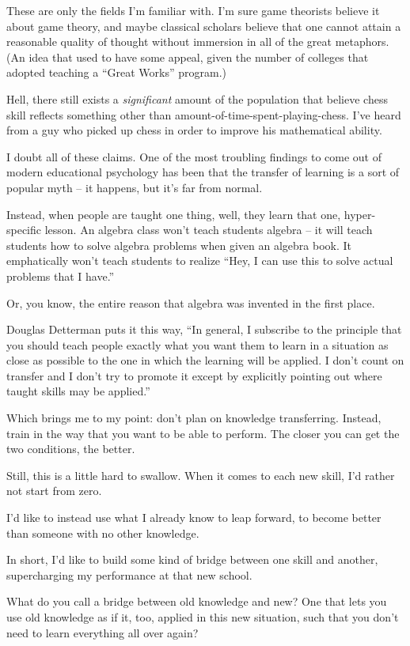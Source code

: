 These are only the fields I'm familiar with. I'm sure game theorists believe it
about game theory, and maybe classical scholars believe that one cannot attain a
reasonable quality of thought without immersion in all of the great
metaphors. (An idea that used to have some appeal, given the number of colleges
that adopted teaching a ``Great Works'' program.)

Hell, there still exists a \textit{significant} amount of the population that
believe chess skill reflects something other than
amount-of-time-spent-playing-chess. I've heard from a guy who picked up chess in
order to improve his mathematical ability.

I doubt all of these claims. One of the most troubling findings to come out of
modern educational psychology has been that the transfer of learning is a sort
of popular myth -- it happens, but it's far from normal.

Instead, when people are taught one thing, well, they learn that one,
hyper-specific lesson. An algebra class won't teach students algebra -- it will
teach students how to solve algebra problems when given an algebra book. It
emphatically won't teach students to realize ``Hey, I can use this to solve
actual problems that I have.''

Or, you know, the entire reason that algebra was invented in the first place.

Douglas Detterman puts it this way, ``In general, I subscribe to the principle
that you should teach people exactly what you want them to learn in a situation
as close as possible to the one in which the learning will be applied.  I don't
count on transfer and I don't try to promote it except by explicitly pointing
out where taught skills may be applied.''

Which brings me to my point: don't plan on knowledge transferring. Instead,
train in the way that you want to be able to perform. The closer you can get the
two conditions, the better.

Still, this is a little hard to swallow.  When it comes to each new skill, I'd
rather not start from zero.

I'd like to instead use what I already know to leap forward, to become better
than someone with no other knowledge.

In short, I'd like to build some kind of bridge between one skill and another,
supercharging my performance at that new school.

What do you call a bridge between old knowledge and new? One that lets you use
old knowledge as if it, too, applied in this new situation, such that you don't
need to learn everything all over again?

